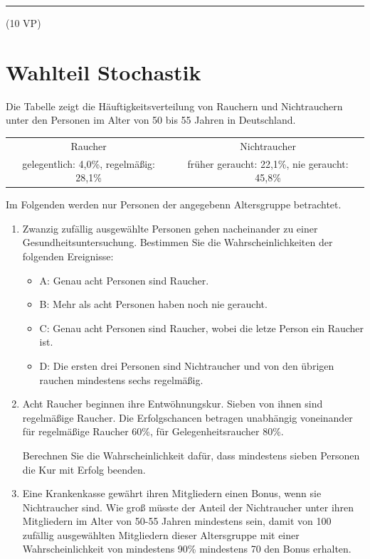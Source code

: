 \vfill

\hfill\rule{1.5cm}{0.4mm}

\hfill (10 VP)\hspace{0.22cm}


\section{Wahlteil Stochastik}
Die Tabelle zeigt die Häuftigkeitsverteilung von Rauchern und Nichtrauchern unter den Personen im Alter von 50 bis 55 Jahren in Deutschland.

\vspace{2em}
\begin{tabular}{ c|c }
	Raucher & Nichtraucher\\
	gelegentlich: 4,0\%, regelmäßig: 28,1\% & früher geraucht: 22,1\%,  nie geraucht: 45,8\%
\end{tabular}
\vspace{2em}

\noindent
Im Folgenden werden nur Personen der angegebenn Altersgruppe betrachtet.
\begin{enumerate}
	\item Zwanzig zufällig ausgewählte Personen gehen nacheinander zu einer Gesundheitsuntersuchung. Bestimmen Sie die Wahrscheinlichkeiten der folgenden Ereignisse: 
	\begin{itemize}
		\item A: Genau acht Personen sind Raucher.
		\item B: Mehr als acht Personen haben noch nie geraucht.
		\item C: Genau acht Personen sind Raucher, wobei die letze Person ein Raucher ist.
		\item D: Die ersten drei Personen sind Nichtraucher und von den übrigen rauchen mindestens sechs regelmäßig.
	\end{itemize}
	\item Acht Raucher beginnen ihre Entwöhnungskur. Sieben von ihnen sind regelmäßige Raucher. Die Erfolgschancen betragen unabhängig voneinander für regelmäßige Raucher 60\%, für Gelegenheitsraucher 80\%.

	Berechnen Sie die Wahrscheinlichkeit dafür, dass mindestens sieben Personen die Kur mit Erfolg beenden.
	\item Eine Krankenkasse gewährt ihren Mitgliedern einen Bonus, wenn sie Nichtraucher sind. Wie groß müsste der Anteil der Nichtraucher unter ihren Mitgliedern im Alter von 50-55 Jahren mindestens sein, damit von 100 zufällig ausgewählten Mitgliedern dieser Altersgruppe mit einer Wahrscheinlichkeit von mindestens 90\% mindestens 70 den Bonus erhalten.
\end{enumerate}


